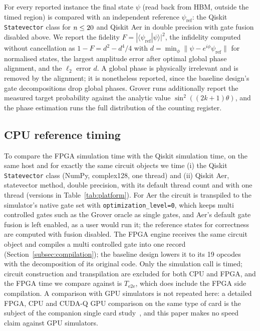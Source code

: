 For every reported instance the final state $\psi$ (read back from HBM, outside the timed region) is compared with
an independent reference $\psi_{\mathrm{ref}}$: the Qiskit \texttt{Statevector} class for $n \le 20$ and Qiskit
Aer in double precision with gate fusion disabled above. We report the fidelity
$F = |\langle \psi_{\mathrm{ref}} | \psi \rangle|^2$, the infidelity computed without cancellation as
$1 - F = d^2 - d^4/4$ with $d = \min_\phi \lVert \psi - e^{i\phi} \psi_{\mathrm{ref}} \rVert$ for normalised states, the
largest amplitude error after optimal global phase alignment, and the $\ell_2$ error $d$. A global phase is
physically irrelevant and is removed by the alignment; it is nonetheless reported, since the baseline design's gate
decompositions drop global phases. Grover runs additionally report the measured target probability against the
analytic value $\sin^2((2k+1)\theta)$, and the phase estimation runs the full distribution of the counting register.

\subsection{CPU reference timing}\label{subsec:method-cpu}

To compare the FPGA simulation time with the Qiskit simulation time, on the same host and
for exactly the same circuit objects we time (i) the Qiskit \texttt{Statevector} class (NumPy, complex128, one
thread) and (ii) Qiskit Aer, statevector method, double precision, with its default thread count and with one
thread (versions in Table~\ref{tab:platform}). For Aer the circuit is transpiled to the simulator's native gate set
with \texttt{optimization\_level=0}, which keeps multi controlled gates such as the Grover oracle as single gates, and
Aer's default gate fusion is left enabled, as a user would run it; the reference states for correctness are computed
with fusion disabled. The FPGA engine receives the same circuit object and compiles a multi controlled gate into
one record (Section~\ref{subsec:compilation}); the baseline design lowers it to its 19 opcodes with the decomposition
of its original code. Only the simulation call is timed; circuit construction and transpilation
are excluded for both CPU and FPGA, and the FPGA time we compare against is $T_{\mathrm{e2e}}$, which does include the
FPGA side compilation. A comparison with GPU simulators is not repeated here: a detailed FPGA, CPU and CUDA-Q GPU
comparison on the same type of card is the subject of the companion single card study~\cite{tiwari2026fpga30}, and this
paper makes no speed claim against GPU simulators.

